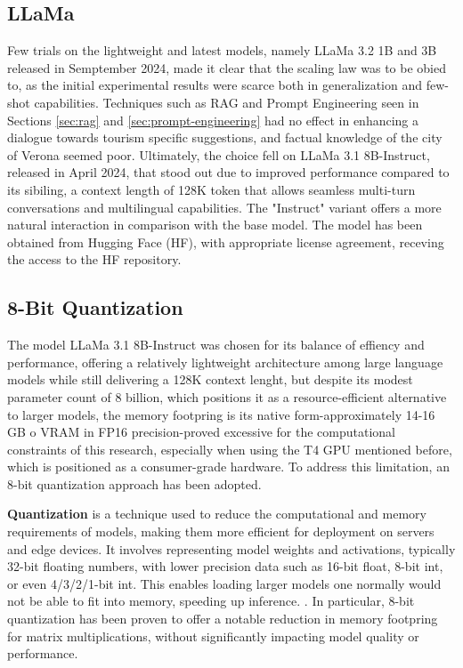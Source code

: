 \subsection{LLaMa}
\label{sec:llama}

Few trials on the lightweight and latest models, namely LLaMa 3.2 1B and 3B released in Semptember 2024, made it clear that the scaling law was to be obied to, as the initial experimental results were scarce both in generalization and few-shot capabilities. Techniques such as RAG and Prompt Engineering seen in Sections \ref{sec:rag} and \ref{sec:prompt-engineering} had no effect in enhancing a dialogue towards tourism specific suggestions, and factual knowledge of the city of Verona seemed poor. Ultimately, the choice fell on LLaMa 3.1 8B-Instruct, released in April 2024, that stood out due to improved performance compared to its sibiling, a context length of 128K token that allows seamless multi-turn conversations and multilingual capabilities. The "Instruct" variant offers a more natural interaction in comparison with the base model. The model has been obtained from Hugging Face (HF), with appropriate license agreement, receving the access to the HF repository.


\subsection{8-Bit Quantization}
\label{sec:quantization}

The model LLaMa 3.1 8B-Instruct was chosen for its balance of effiency and performance, offering a relatively lightweight architecture among large language models while still delivering a 128K context lenght, but despite its modest parameter count of 8 billion, which positions it as a resource-efficient alternative to larger models, the memory footpring is its native form-approximately 14-16 GB o VRAM in FP16 precision-proved excessive for the computational constraints of this research, especially when using the T4 GPU mentioned before, which is positioned as a consumer-grade hardware. To address this limitation, an 8-bit quantization approach has been adopted.

\textbf{Quantization} is a technique used to reduce the computational and memory requirements of models, making them more efficient for deployment on servers and edge devices. It involves representing model weights and activations, typically 32-bit floating numbers, with lower precision data such as 16-bit float, 8-bit int, or even 4/3/2/1-bit int. This enables loading larger models one normally would not be able to fit into memory, speeding up inference. \cite{dettmers2022int8}. In particular, 8-bit quantization has been proven to offer a notable reduction in memory footpring for matrix multiplications, without significantly impacting model quality or performance.

